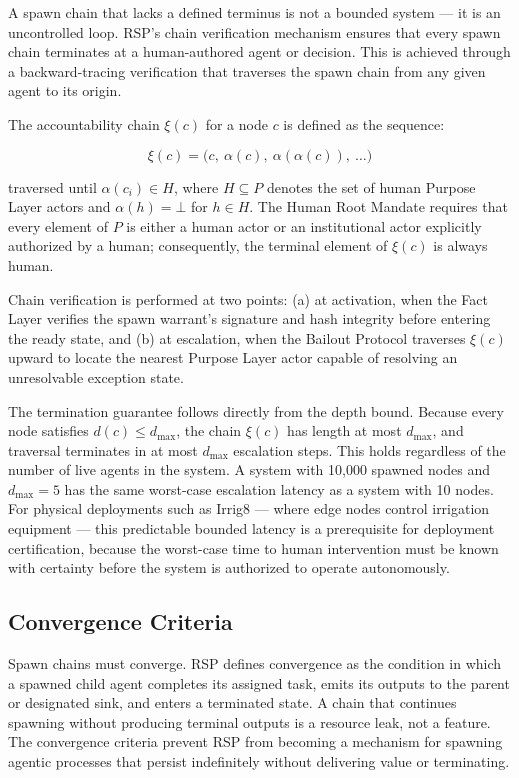 A spawn chain that lacks a defined terminus is not a bounded system — it is an uncontrolled loop. RSP's chain verification mechanism ensures that every spawn chain terminates at a human-authored agent or decision. This is achieved through a backward-tracing verification that traverses the spawn chain from any given agent to its origin.

The accountability chain $\xi(c)$ for a node $c$ is defined as the sequence:

\begin{equation}
\xi(c) = \bigl( c,\ \alpha(c),\ \alpha(\alpha(c)),\ \ldots \bigr)
\tag{3}
\end{equation}

traversed until $\alpha(c_i) \in H$, where $H \subseteq P$ denotes the set of human Purpose Layer actors and $\alpha(h) = \bot$ for $h \in H$. The Human Root Mandate requires that every element of $P$ is either a human actor or an institutional actor explicitly authorized by a human; consequently, the terminal element of $\xi(c)$ is always human.

Chain verification is performed at two points: (a) at activation, when the Fact Layer verifies the spawn warrant's signature and hash integrity before entering the ready state, and (b) at escalation, when the Bailout Protocol traverses $\xi(c)$ upward to locate the nearest Purpose Layer actor capable of resolving an unresolvable exception state.

The termination guarantee follows directly from the depth bound. Because every node satisfies $d(c) \leq d_{\max}$, the chain $\xi(c)$ has length at most $d_{\max}$, and traversal terminates in at most $d_{\max}$ escalation steps. This holds regardless of the number of live agents in the system. A system with 10,000 spawned nodes and $d_{\max} = 5$ has the same worst-case escalation latency as a system with 10 nodes. For physical deployments such as Irrig8 — where edge nodes control irrigation equipment — this predictable bounded latency is a prerequisite for deployment certification, because the worst-case time to human intervention must be known with certainty before the system is authorized to operate autonomously.

\subsection{Convergence Criteria}
\label{sec:convergence}

Spawn chains must converge. RSP defines convergence as the condition in which a spawned child agent completes its assigned task, emits its outputs to the parent or designated sink, and enters a terminated state. A chain that continues spawning without producing terminal outputs is a resource leak, not a feature. The convergence criteria prevent RSP from becoming a mechanism for spawning agentic processes that persist indefinitely without delivering value or terminating.

